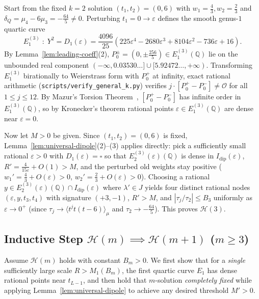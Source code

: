 \documentclass[11pt,a4paper]{article}
\theoremstyle{definition}
\theoremstyle{remark}
\newcommand{\QQ}{\mathbb{Q}}
\begin{document}
Start from the fixed $k = 2$ solution $(t_1, t_2) = (0, 6)$ with $w_1 = \frac{4}{3}, w_2 = \frac{2}{3}$ and $\delta_Q = \mu_4 - 6\mu_3 = -\frac{64}{5} \neq 0$. Perturbing $t_1 = 0 \to \varepsilon$ defines the smooth genus-$1$ quartic curve
\[
E_1^{(3)} \;:\; Y^2 = D_1(\varepsilon) = \frac{4096}{25}\left(225 \varepsilon^4 - 2680 \varepsilon^3 + 8104 \varepsilon^2 - 736 \varepsilon + 16\right).
\]
By Lemma~\ref{lem:leading-coeff}(2), $P_0^\pm = (0, \pm \frac{256}{5}) \in E_1^{(3)}(\QQ)$ lie on the unbounded real component $(-\infty, 0.03530\dots] \cup [5.92472\dots, +\infty)$. Transforming $E_1^{(3)}$ birationally to Weierstrass form with $P_0^+$ at infinity, exact rational arithmetic (\texttt{scripts/verify\_general\_k.py}) verifies $j \cdot [P_0^+ - P_0^-] \neq \mathcal{O}$ for all $1 \le j \le 12$. By Mazur's Torsion Theorem~\cite{Mazur1977}, $[P_0^+ - P_0^-]$ has infinite order in $E_1^{(3)}(\QQ)$, so by Kronecker's theorem rational points $\varepsilon \in E_1^{(3)}(\QQ)$ are dense near $\varepsilon = 0$.

Now let $M > 0$ be given. Since $(t_1, t_2) = (0, 6)$ is fixed, Lemma~\ref{lem:universal-dipole}(2)--(3) applies directly: pick a sufficiently small rational $\varepsilon > 0$ with $D_1(\varepsilon) = \square$ so that $E_2^{(3)}(\varepsilon)(\QQ)$ is dense in $I_{\mathrm{dip}}(\varepsilon)$, $R' = \frac{4}{15\varepsilon} + O(1) > M$, and the perturbed old weights stay positive ($w_1' = \frac{4}{3} + O(\varepsilon) > 0$, $w_2' = \frac{2}{3} + O(\varepsilon) > 0$). Choosing a rational $y \in E_2^{(3)}(\varepsilon)(\QQ) \cap I_{\mathrm{dip}}(\varepsilon)$ where $\lambda' \in J$ yields four distinct rational nodes $(\varepsilon, y, t_3, t_4)$ with signature $(+3, -1)$, $R' > M$, and $|\tau_j / \tau_2| \le B_3$ uniformly as $\varepsilon \to 0^+$ (since $\tau_j \to \langle t^j t(t - 6) \rangle_\mu$ and $\tau_2 \to -\frac{64}{5}$). This proves $\mathcal{H}(3)$.

\subsection{Inductive Step $\mathcal{H}(m) \implies \mathcal{H}(m + 1)$ ($m \ge 3$)}

Assume $\mathcal{H}(m)$ holds with constant $B_m > 0$. We first show that for a \emph{single} sufficiently large scale $R > M_1(B_m)$, the first quartic curve $E_1$ has dense rational points near $t_{L-1}$, and then hold that $m$-solution \emph{completely fixed} while applying Lemma~\ref{lem:universal-dipole} to achieve any desired threshold $M' > 0$.
\end{document}
